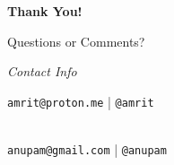 \documentclass[14pt, aspectratio=169]{beamer}
\begin{document}
\begin{frame}[plain]
	\begin{center}
		\vfill
		{\Huge\bfseries Thank You! \par}
		\vspace{1.5cm}
		{\Large Questions or Comments?} \par
		\vspace{0.5cm}
		\textit{Contact Info} \par
		\vspace{0.3cm}
		\texttt{amrit@proton.me} \quad | \quad \texttt{@amrit} \quad \par\\
		\texttt{anupam@gmail.com} \quad | \quad \texttt{@anupam} \quad \par



		\vfill


\end{center}
\end{frame}
\end{document}
